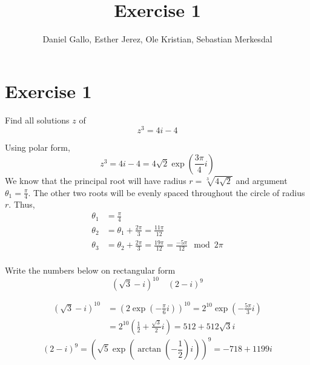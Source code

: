 \documentclass{report}
\title{Exercise 1}
\author{Daniel Gallo, Esther Jerez, Ole Kristian, Sebastian Merkesdal}
\renewcommand{\exp}[1]{\operatorname{exp} \left(#1\right)}
\renewcommand{\arctan}[1]{\operatorname{arctan} \left(#1\right)}
\begin{document}
    \maketitle
    
    \section*{Exercise 1}
    \begin{tcolorbox}[title=Part a]
        Find all solutions $z$ of
        \begin{equation*}
            z^3 = 4i - 4
        \end{equation*}
    \end{tcolorbox}
    \noindent
    Using polar form,
    \begin{equation*}
        z^3 = 4i - 4 = 4\sqrt{2}\exp{\frac{3\pi}{4}i}
    \end{equation*}
    We know that the principal root will have radius $r = \sqrt[3]{4\sqrt{2}}$ and argument $\theta_1 = \frac{\pi}{4}$. The other two roots will be evenly spaced throughout the circle of radius $r$. Thus,
    \begin{align*}
        \theta_1 &= \frac{\pi}{4} \\
        \theta_2 &= \theta_1 + \frac{2\pi}{3} = \frac{11\pi}{12} \\
        \theta_3 &= \theta_2 + \frac{2\pi}{3} = \frac{19\pi}{12} = \frac{-5\pi}{12} \mod{2\pi}\\
    \end{align*}
    \begin{tcolorbox}[title=Part b]
        Write the numbers below on rectangular form
        \begin{equation*}
            (\sqrt{3} - i)^{10} \quad (2 - i)^{9}
        \end{equation*}
    \end{tcolorbox}
    \begin{align*}
        (\sqrt{3} - i)^{10} &= \left(2\exp{-\frac{\pi}{6}i}\right)^{10} = 2^{10}\exp{-\frac{5\pi}{3}i} \\
        &= 2^{10}\left(\frac{1}{2} + \frac{\sqrt{3}}{2}i\right) = 512 + 512\sqrt{3}i
    \end{align*}
    \begin{equation*}
        (2 - i)^{9} = \left(\sqrt{5}\exp{\arctan{-\frac{1}{2}}i}\right)^{9} = -718 + 1199i
    \end{equation*}
\end{document}
